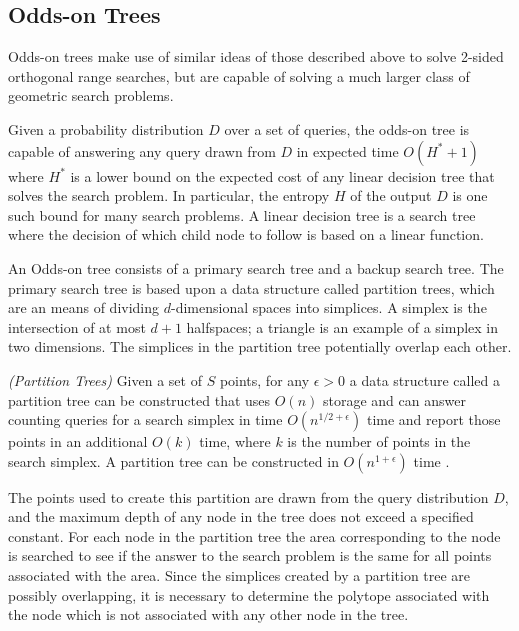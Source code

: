 \documentclass[mcs]{scsthesis}
\begin{document}

\subsection{Odds-on Trees}

Odds-on trees make use of similar ideas of those described above to solve
2-sided orthogonal range searches, but are capable of solving a much larger
class of geometric search problems.

Given a probability distribution \(D\) over a set of queries, the odds-on tree
is capable of answering any query drawn from \(D\) in expected time
\(O(H^* + 1)\) where \(H^*\) is a lower bound on the expected cost of any
linear decision tree that solves the search problem. In particular, the
entropy \(H\) of the output \(D\) is one such bound for many search
problems. A linear decision tree is a search tree where the decision of which
child node to follow is based on a linear function.

An Odds-on tree consists of a primary search tree and a backup search tree.
The primary search tree is based upon a data structure called partition trees,
which are an means of dividing \(d\)-dimensional spaces into simplices. A
simplex is the intersection of at most \(d + 1\) halfspaces; a triangle is an
example of a simplex in two dimensions. The simplices in the partition tree
potentially overlap each other.

\begin{thm} \emph{(Partition Trees)} 
Given a set of \(S\) points, for any \(\epsilon > 0\) a data structure called
a partition tree can be constructed that uses \(O(n)\) storage and can answer
counting queries for a search simplex in time \(O(n^{1/2 + \epsilon})\) time and
report those points in an additional \(O(k)\) time, where \(k\) is the number
of points in the search simplex. A partition tree can be constructed in
\(O(n^{1 + \epsilon})\) time \cite{dutch}.
\end{thm}

The points used to create this partition are drawn from the query distribution
\(D\), and the maximum depth of any node in the tree does not exceed a specified
constant. For each node in the partition tree the area corresponding to the node
is searched to see if the answer to the search problem is the same for all points
associated with the area. Since the simplices created by a partition tree are
possibly overlapping, it is necessary to determine the polytope associated with
the node which is not associated with any other node in the tree.
\end{document}
